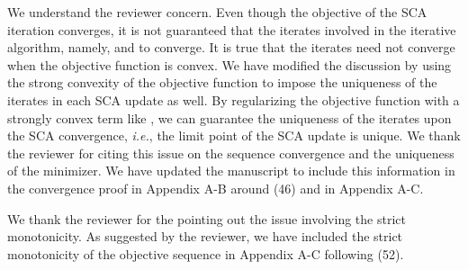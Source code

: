 \begin{enumerate}
\resp We understand the reviewer concern. Even though the objective of the \ac{SCA} iteration converges, it is not guaranteed that the iterates involved in the iterative algorithm, namely,  and  to converge. It is true that the iterates need not converge when the objective function is convex. We have modified the discussion by using the strong convexity of the objective function to impose the uniqueness of the iterates in each \ac{SCA} update as well. By regularizing the objective function with a strongly convex term like , we can guarantee the uniqueness of the iterates upon the \ac{SCA} convergence, \textit{i.e.}, the limit point of the \ac{SCA} update is unique. We thank the reviewer for citing this issue on the sequence convergence and the uniqueness of the minimizer. We have updated the manuscript to include this information in the convergence proof in Appendix A-B around (46) and in Appendix A-C.

  

\resp We thank the reviewer for the pointing out the issue involving the strict monotonicity. As suggested by the reviewer, we have included the strict monotonicity of the objective sequence in Appendix A-C following (52). 


\end{enumerate}
